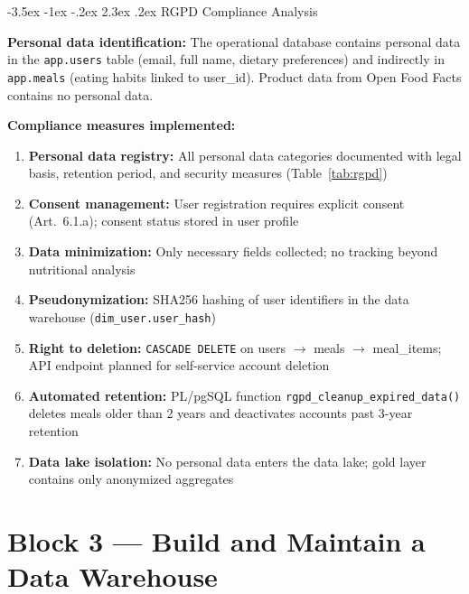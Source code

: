 \documentclass[a4paper,11pt,oneside,openany]{report}
\makeatletter
\renewcommand\section{\@startsection{section}{1}{\z@}%
  {-3.5ex \@plus -1ex \@minus -.2ex}%
  {2.3ex \@plus.2ex}%
  {\normalfont\Large\bfseries\color{ntgreen}}}
\newcommand{\off}{Open Food Facts}
\newcommand{\rgpd}{RGPD}
\makeatother
\begin{document}
\section{\rgpd{} Compliance Analysis}
\label{sec:rgpd-e4}

\textbf{Personal data identification:} The operational database contains
personal data in the \texttt{app.users} table (email, full name, dietary
preferences) and indirectly in \texttt{app.meals} (eating habits linked to
user\_id). Product data from \off{} contains no personal data.

\textbf{Compliance measures implemented:}
\begin{enumerate}[nosep]
  \item \textbf{Personal data registry:} All personal data categories
        documented with legal basis, retention period, and security measures
        (Table~\ref{tab:rgpd})
  \item \textbf{Consent management:} User registration requires explicit
        consent (Art.~6.1.a); consent status stored in user profile
  \item \textbf{Data minimization:} Only necessary fields collected; no
        tracking beyond nutritional analysis
  \item \textbf{Pseudonymization:} SHA256 hashing of user identifiers in
        the data warehouse (\texttt{dim\_user.user\_hash})
  \item \textbf{Right to deletion:} \texttt{CASCADE DELETE} on
        users $\to$ meals $\to$ meal\_items; API endpoint planned for
        self-service account deletion
  \item \textbf{Automated retention:} PL/pgSQL function
        \texttt{rgpd\_cleanup\_expired\_data()} deletes meals older than
        2 years and deactivates accounts past 3-year retention
  \item \textbf{Data lake isolation:} No personal data enters the data lake;
        gold layer contains only anonymized aggregates
\end{enumerate}


\chapter{Block 3 --- Build and Maintain a Data Warehouse}
\label{ch:bloc3}
\end{document}
